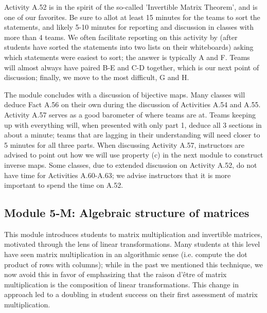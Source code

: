 \documentclass{article}
\begin{document}
Activity A.52 is in the spirit of the so-called 'Invertible Matrix Theorem', and is one of our favorites. Be sure to allot at least 15 minutes for the teams to sort the statements, and likely 5-10 minutes for reporting and discussion in classes with more than 4 teams.  We often facilitate reporting on this activity by (after students have sorted the statements into two lists on their whiteboards) asking which statements were easiest to sort; the answer is typically A and F.  Teams will almost always have paired B-E and C-D together, which is our next point of discussion; finally, we move to the most difficult, G and H. 

The module concludes with a discussion of bijective maps. Many classes will deduce Fact A.56 on their own during the discussion of Activities A.54 and A.55.  Activity A.57 serves as a good barometer of where teams are at.  Teams keeping up with everything will, when presented with only part 1, deduce all 3 sections in about a minute; teams that are lagging in their understanding will need closer to 5 minutes for all three parts.  When discussing Activity A.57, instructors are advised to point out how we will use property (c) in the next module to construct inverse maps.  Some classes, due to extended discussion on Activity A.52, do not have time for Activities A.60-A.63; we advise instructors that it is more important to spend the time on A.52.


\subsection*{Module 5-M: Algebraic structure of matrices}
This module introduces students to matrix multiplication and invertible matrices, motivated through the lens of linear transformations.  Many students at this level have seen matrix multiplication in an algorithmic sense (i.e. compute the dot product of rows with columns); while in the past we mentioned this technique, we now avoid this in favor of emphasizing that the raison d'\^{e}tre of matrix multiplication is the composition of linear transformations.  This change in approach led to a doubling in student success on their first assessment of matrix multiplication.
\end{document}
